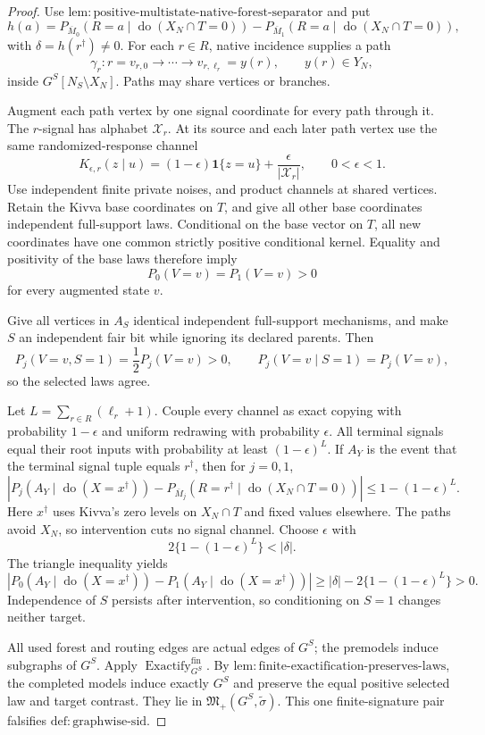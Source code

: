 \documentclass{article}
\begin{document}
\begin{proof}
Use \(\mathrm{lem:positive\text{-}multistate\text{-}native\text{-}forest\text{-}separator}\) and put
\[
 h(a)=P_{\overline M_0}(R=a\mid\operatorname{do}(X_N\cap T=0))
 -P_{\overline M_1}(R=a\mid\operatorname{do}(X_N\cap T=0)),
\]
with \(\delta=h(r^\dagger)\ne0\). For each \(r\in R\), native incidence supplies a path
\[
 \gamma_r:r=v_{r,0}\to\cdots\to v_{r,\ell_r}=y(r),
 \qquad y(r)\in Y_N,
\]
inside \(G^S[N_S\setminus X_N]\). Paths may share vertices or branches.

Augment each path vertex by one signal coordinate for every path through it. The \(r\)-signal has alphabet \(\mathcal X_r\). At its source and each later path vertex use the same randomized-response channel
\[
 K_{\epsilon,r}(z\mid u)
 =(1-\epsilon)\mathbf 1\{z=u\}+\frac{\epsilon}{|\mathcal X_r|},
 \qquad 0<\epsilon<1.
\]
Use independent finite private noises, and product channels at shared vertices. Retain the Kivva base coordinates on \(T\), and give all other base coordinates independent full-support laws. Conditional on the base vector on \(T\), all new coordinates have one common strictly positive conditional kernel. Equality and positivity of the base laws therefore imply
\[
 P_0(V=v)=P_1(V=v)>0
\]
for every augmented state \(v\).

Give all vertices in \(A_S\) identical independent full-support mechanisms, and make \(S\) an independent fair bit while ignoring its declared parents. Then
\[
 P_j(V=v,S=1)=\frac12P_j(V=v)>0,\qquad
 P_j(V=v\mid S=1)=P_j(V=v),
\]
so the selected laws agree.

Let \(L=\sum_{r\in R}(\ell_r+1)\). Couple every channel as exact copying with probability \(1-\epsilon\) and uniform redrawing with probability \(\epsilon\). All terminal signals equal their root inputs with probability at least \((1-\epsilon)^L\). If \(A_Y\) is the event that the terminal signal tuple equals \(r^\dagger\), then for \(j=0,1\),
\[
 \left|P_j(A_Y\mid\operatorname{do}(X=x^\dagger))
 -P_{\overline M_j}(R=r^\dagger\mid\operatorname{do}(X_N\cap T=0))\right|
 \le1-(1-\epsilon)^L.
\]
Here \(x^\dagger\) uses Kivva's zero levels on \(X_N\cap T\) and fixed values elsewhere. The paths avoid \(X_N\), so intervention cuts no signal channel. Choose \(\epsilon\) with
\[
 2\{1-(1-\epsilon)^L\}<|\delta|.
\]
The triangle inequality yields
\[
 |P_0(A_Y\mid\operatorname{do}(X=x^\dagger))
 -P_1(A_Y\mid\operatorname{do}(X=x^\dagger))|
 \ge|\delta|-2\{1-(1-\epsilon)^L\}>0.
\]
Independence of \(S\) persists after intervention, so conditioning on \(S=1\) changes neither target.

All used forest and routing edges are actual edges of \(G^S\); the premodels induce subgraphs of \(G^S\). Apply \(\operatorname{Exactify}^{\mathrm{fin}}_{G^S}\). By \(\mathrm{lem:finite\text{-}exactification\text{-}preserves\text{-}laws}\), the completed models induce exactly \(G^S\) and preserve the equal positive selected law and target contrast. They lie in \(\mathfrak M_+(G^S,\widetilde\sigma)\). This one finite-signature pair falsifies \(\mathrm{def:graphwise\text{-}sid}\).
\end{proof}
\end{document}
